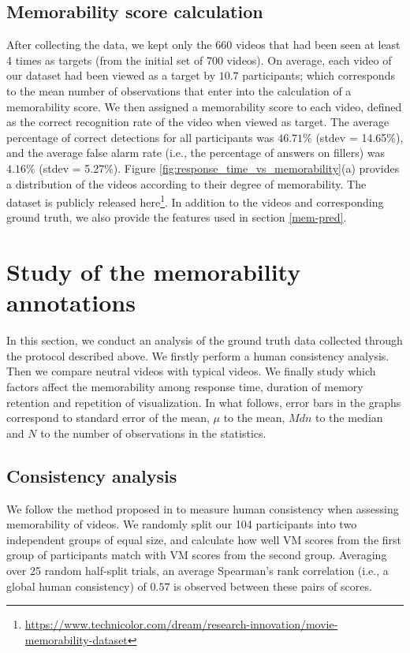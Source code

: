 \documentclass[sigconf]{acmart}
\begin{document}
\subsection{Memorability score calculation}
After collecting the data, we kept only the 660 videos that had been seen at least 4 times as targets (from the initial set of 700 videos).
On average, each video of our dataset had been viewed as a target by $10.7$ participants; which corresponds to the mean number of observations that enter into the calculation of a memorability score.
We then assigned a memorability score to each video, defined as the correct recognition rate of the video when viewed as target.
The average percentage of correct detections for all participants was $46.71\%$ (stdev = 14.65\%), and the average false alarm rate (i.e., the percentage of answers on fillers) was $4.16\%$ (stdev = 5.27\%).
Figure \ref{fig:response_time_vs_memorability}(a) provides a distribution of the videos according to their degree of memorability.
The dataset is publicly released here\footnote{\url{https://www.technicolor.com/dream/research-innovation/movie-memorability-dataset}}. In addition to the videos and corresponding ground truth, we also provide the features used in section \ref{mem-pred}.

\section{Study of the memorability annotations}
\label{study_memorability}
In this section, we conduct an analysis of the ground truth data collected through the protocol described above.
We firstly perform a human consistency analysis.
Then we compare neutral videos with typical videos.
We finally study which factors affect the memorability among response time, duration of memory retention and repetition of visualization.
In what follows, error bars in the graphs correspond to standard error of the mean, $\mu$ to the mean, $Mdn$ to the median and $N$ to the number of observations in the statistics.

\subsection{Consistency analysis}
\label{ssec:human}
We follow the method proposed in \cite{isola_2014_makes} to measure human consistency when assessing memorability of videos.
We randomly split our 104 participants into two independent groups of equal size, and calculate how well VM scores from the first group of participants match with VM scores from the second group.
Averaging over 25 random half-split trials, an average Spearman's rank correlation (i.e., a global human consistency) of $0.57$ is observed between these pairs of scores.
\end{document}
